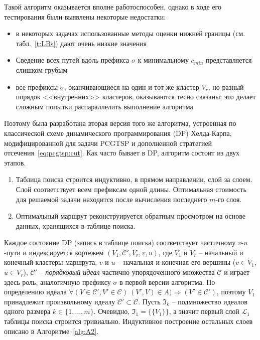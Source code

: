 Такой алгоритм оказывается вполне работоспособен,
однако в ходе его тестирования были выявлены некоторые недостатки:
\begin{itemize}
    \item
    в некоторых задачах использованные методы
    оценки нижней границы
    (см. табл.~\ref{t:LBs})
    дают очень низкие значения
    \item
    Сведение всех путей вдоль префикса $\sigma$
    к минимальному $c_{min}$
    представляется слишком грубым
    \item
    все префиксы $\sigma$,
    оканчивающиеся на один и тот же
    кластер $V_r$,
    но разный порядок <<внутренних>> кластеров,
    оказываются тесно связаны;
    это делает сложным попытки распараллелить
    выполнение алгоритма
\end{itemize}

Поэтому была разработана вторая версия того же алгоритма,
устроенная по классической схеме
динамического программирования (DP)
Хелда-Карпа,
модифицированной для задачи PCGTSP
и дополненной стратегией отсечения~\eqref{eq:pcgtsp:cut}.
Как часто бывает в DP,
алгоритм состоит из двух этапов.
\begin{enumerate}
  \item
  Таблица поиска строится индуктивно,
  в прямом направлении,
  слой за слоем.
  Слой соответствует всем префиксам одной длины.
  Оптимальная стоимость для решаемой задачи
  находится после вычисления последнего $m$-го слоя.
  \item
  Оптимальный маршрут реконструируется обратным просмотром
  на основе данных,
  хранящихся в таблице поиска.
\end{enumerate}

Каждое состояние DP
(запись в таблице поиска)
соответствует частичному
$v$-$u$-пути
и индексируется кортежем
$(V_1, \mathcal C',V_r,v, u)$, где
$V_1$ и $V_r$ -- начальный и конечный кластеры маршрута,
$v$ и $u$ -- начальная и конечная его вершины ($v\in V_1$, $u\in V_r$),
$\mathcal C'$ -- {\it порядковый идеал} частично упорядоченного множества $\mathcal C$
и играет здесь роль, аналогичную префиксу $\sigma$
в первой версии алгоритма.
По определению идеала
\(
    \forall (V\in\mathcal C', V'\in\mathcal C)\   (V',V)\in A)
    \Rightarrow (V'\in\mathcal C')
\),
поэтому $V_1$
принадлежит произвольному идеалу
$\mathcal C'\subset\mathcal C$.
Пусть $\mathfrak I_k$
-- подмножество идеалов одного размера
$k\in\{1,\ldots,m\}$.
Очевидно,
$\mathfrak I_1=\{\{V_1\}\}$,
а значит первый слой
$\mathcal L_1$
таблицы поиска строится тривиально.
Индуктивное построение остальных слоев
описано в Алгоритме~\ref{alg:A2}.

